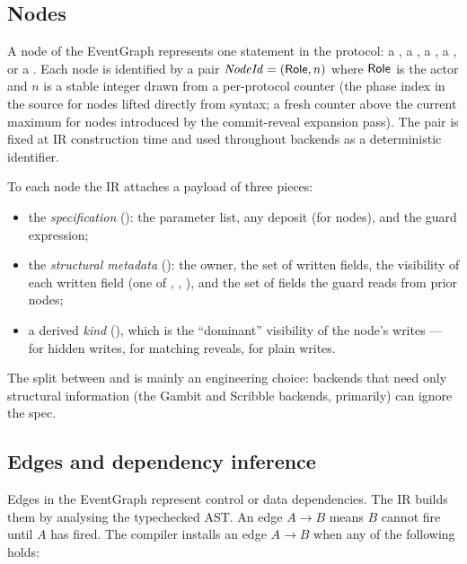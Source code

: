 \subsection{Nodes}

A node of the EventGraph represents one statement in the protocol:
a , a , a , a , or a
.  Each node is identified by a pair
$\mathit{NodeId} = (\mathsf{Role}, n)$ where $\mathsf{Role}$ is the actor and $n$
is a stable integer drawn from a per-protocol counter (the
phase index in the source for nodes lifted directly from
syntax; a fresh counter above the current maximum for nodes
introduced by the commit-reveal expansion pass).  The pair is
fixed at IR construction time and used throughout backends as a
deterministic identifier.

To each node the IR attaches a payload of three pieces:

\begin{itemize}\itemsep1pt
\item the \emph{specification} (): the parameter list,
  any deposit (for  nodes), and the guard expression;
\item the \emph{structural metadata} (): the owner,
  the set of written fields, the visibility of each written field
  (one of \COMMIT, \REVEAL, \PUBLIC), and the set of fields the
  guard reads from prior nodes;
\item a derived \emph{kind} (), which is the
  ``dominant'' visibility of the node's writes ---
  \COMMIT for hidden writes, \REVEAL for matching reveals,
  \PUBLIC for plain writes.
\end{itemize}

The split between  and  is mainly an
engineering choice: backends that need only structural information
(the Gambit and Scribble backends, primarily) can ignore the spec.

\subsection{Edges and dependency inference}
\label{sec:eventgraph:edges}

Edges in the EventGraph represent control or data dependencies.
The IR builds them by analysing the typechecked AST.  An edge
$A \to B$ means $B$ cannot fire until $A$ has fired.  The
compiler installs an edge $A \to B$ when any of the following
holds:

